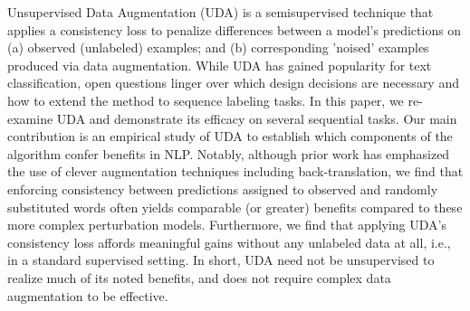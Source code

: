Unsupervised Data Augmentation (UDA) is a semisupervised technique that applies a consistency loss to penalize differences between a model's predictions on (a) observed (unlabeled) examples; and (b) corresponding 'noised' examples produced via data augmentation. While UDA has gained popularity for text classification, open questions linger over which design decisions are necessary and how to extend the method to sequence labeling tasks. In this paper, we re-examine UDA and demonstrate its efficacy on several sequential tasks. Our main contribution is an empirical study of UDA to establish which components of the algorithm confer benefits in NLP. Notably, although prior work has emphasized the use of clever augmentation techniques including back-translation, we find that enforcing consistency between predictions assigned to observed and randomly substituted words often yields comparable (or greater) benefits compared to these more complex perturbation models. Furthermore, we find that applying UDA's consistency loss affords meaningful gains without any unlabeled data at all, i.e., in a standard supervised setting. In short, UDA need not be unsupervised to realize much of its noted benefits, and does not require complex data augmentation to be effective.
